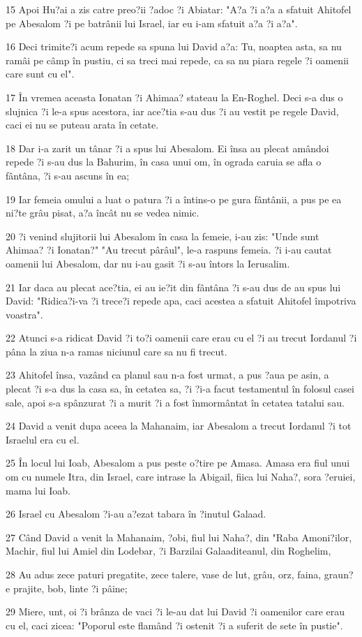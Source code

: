 \par 15 Apoi Hu?ai a zis catre preo?ii ?adoc ?i Abiatar: "A?a ?i a?a a sfatuit Ahitofel pe Abesalom ?i pe batrânii lui Israel, iar eu i-am sfatuit a?a ?i a?a".
\par 16 Deci trimite?i acum repede sa spuna lui David a?a: Tu, noaptea asta, sa nu ramâi pe câmp în pustiu, ci sa treci mai repede, ca sa nu piara regele ?i oamenii care sunt cu el".
\par 17 În vremea aceasta Ionatan ?i Ahimaa? stateau la En-Roghel. Deci s-a dus o slujnica ?i le-a spus acestora, iar ace?tia s-au dus ?i au vestit pe regele David, caci ei nu se puteau arata în cetate.
\par 18 Dar i-a zarit un tânar ?i a spus lui Abesalom. Ei însa au plecat amândoi repede ?i s-au dus la Bahurim, în casa unui om, în ograda caruia se afla o fântâna, ?i s-au ascuns în ea;
\par 19 Iar femeia omului a luat o patura ?i a întins-o pe gura fântânii, a pus pe ea ni?te grâu pisat, a?a încât nu se vedea nimic.
\par 20 ?i venind slujitorii lui Abesalom în casa la femeie, i-au zis: "Unde sunt Ahimaa? ?i Ionatan?" "Au trecut pârâul", le-a raspuns femeia. ?i i-au cautat oamenii lui Abesalom, dar nu i-au gasit ?i s-au întors la Ierusalim.
\par 21 Iar daca au plecat ace?tia, ei au ie?it din fântâna ?i s-au dus de au spus lui David: "Ridica?i-va ?i trece?i repede apa, caci acestea a sfatuit Ahitofel împotriva voastra".
\par 22 Atunci s-a ridicat David ?i to?i oamenii care erau cu el ?i au trecut Iordanul ?i pâna la ziua n-a ramas niciunul care sa nu fi trecut.
\par 23 Ahitofel însa, vazând ca planul sau n-a fost urmat, a pus ?aua pe asin, a plecat ?i s-a dus la casa sa, în cetatea sa, ?i ?i-a facut testamentul în folosul casei sale, apoi s-a spânzurat ?i a murit ?i a fost înmormântat în cetatea tatalui sau.
\par 24 David a venit dupa aceea la Mahanaim, iar Abesalom a trecut Iordanul ?i tot Israelul era cu el.
\par 25 În locul lui Ioab, Abesalom a pus peste o?tire pe Amasa. Amasa era fiul unui om cu numele Itra, din Israel, care intrase la Abigail, fiica lui Naha?, sora ?eruiei, mama lui Ioab.
\par 26 Israel cu Abesalom ?i-au a?ezat tabara în ?inutul Galaad.
\par 27 Când David a venit la Mahanaim, ?obi, fiul lui Naha?, din "Raba Amoni?ilor, Machir, fiul lui Amiel din Lodebar, ?i Barzilai Galaaditeanul, din Roghelim,
\par 28 Au adus zece paturi pregatite, zece talere, vase de lut, grâu, orz, faina, graun?e prajite, bob, linte ?i pâine;
\par 29 Miere, unt, oi ?i brânza de vaci ?i le-au dat lui David ?i oamenilor care erau cu el, caci zicea: "Poporul este flamând ?i ostenit ?i a suferit de sete în pustie".

